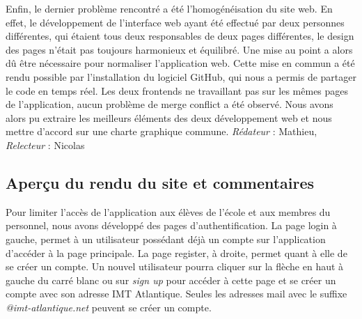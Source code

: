 \documentclass[oneside,a4paper,13pt]{article}
\begin{document}
\medbreak
Enfin, le dernier problème rencontré a été l'homogénéisation du site web. En effet, le développement de l'interface web ayant été effectué par deux personnes différentes, qui étaient tous deux responsables de deux pages différentes, le design des pages n’était pas toujours harmonieux et équilibré. Une mise au point a alors dû être nécessaire pour normaliser l’application web. Cette mise en commun a été rendu possible par l’installation du logiciel GitHub, qui nous a permis de partager le code en temps réel. Les deux frontends ne travaillant pas sur les mêmes pages de l’application, aucun problème de merge conflict a été observé. Nous avons alors pu extraire les meilleurs éléments des deux développement web et nous mettre d'accord sur une charte graphique commune. 
\smallbreak\textit{Rédateur} : Mathieu, \textit{Relecteur} : Nicolas

\subsection{Aperçu du rendu du site et commentaires}

Pour limiter l'accès de l'application aux élèves de l'école et aux membres du personnel, nous avons développé des pages d'authentification. La page login à gauche, permet à un utilisateur possédant déjà un compte sur l'application d'accéder à la page principale. La page register, à droite, permet quant à elle de se créer un compte. Un nouvel utilisateur pourra cliquer sur la flèche en haut à gauche du carré blanc ou sur \textit{sign up} pour accéder à cette page et se créer un compte avec son adresse IMT Atlantique.  Seules les adresses mail avec le suffixe \textit{@imt-atlantique.net} peuvent se créer un compte. 
\end{document}
